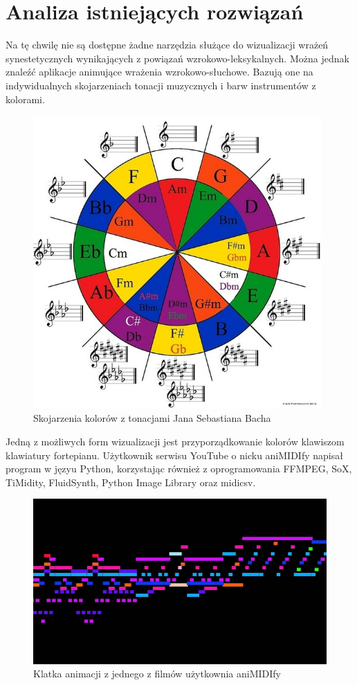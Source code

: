 \documentclass[12pt]{article}
\begin{document}
\section{Analiza istniejących rozwiązań}
Na tę chwilę nie są dostępne żadne narzędzia służące do wizualizacji wrażeń synestetycznych wynikających z powiązań wzrokowo-leksykalnych. Można jednak znaleźć aplikacje animujące wrażenia wzrokowo-słuchowe. Bazują one na indywidualnych skojarzeniach tonacji muzycznych i barw instrumentów z kolorami. 
\begin{figure}[H]
	\centering
	\includegraphics[width=11cm]{Bach.jpeg}
	\caption{Skojarzenia kolorów z tonacjami Jana Sebastiana Bacha}
\end{figure}
\pagebreak
Jedną z możliwych form wizualizacji jest przyporządkowanie kolorów klawiszom klawiatury fortepianu. Użytkownik serwisu YouTube o nicku aniMIDIfy napisał program w języu Python, korzystając również z oprogramowania FFMPEG, SoX, TiMidity, FluidSynth, Python Image Library oraz midicsv.
\begin{figure}[H]
	\centering
	\includegraphics[width=\textwidth]{animidify.jpg}
	\caption{Klatka animacji z jednego z filmów użytkownia aniMIDIfy}
\end{figure}
\end{document}
